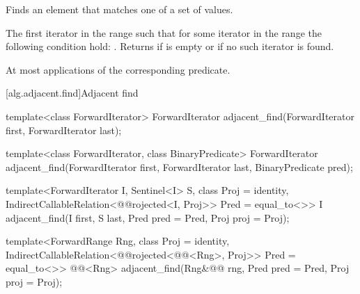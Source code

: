 \begin{itemdescr}
\pnum
\effects
Finds an element that matches one of a set of values.

\pnum
\returns
The first iterator
in the range 
such that for some
iterator
in the range 
the following condition hold:
.
Returns 
if  is empty or if
no such iterator is found.

\pnum
\complexity
At most
applications of the corresponding predicate.
\end{itemdescr}

[alg.adjacent.find]{Adjacent find}

%
\begin{removedblock}
\begin{itemdecl}
template<class ForwardIterator>
  ForwardIterator adjacent_find(ForwardIterator first, ForwardIterator last);

template<class ForwardIterator, class BinaryPredicate>
  ForwardIterator adjacent_find(ForwardIterator first, ForwardIterator last,
                              BinaryPredicate pred);
\end{itemdecl}
\end{removedblock}
\begin{addedblock}
\begin{itemdecl}
template<ForwardIterator I, Sentinel<I> S, class Proj = identity,
    IndirectCallableRelation<@@rojected<I, Proj>> Pred = equal_to<>>
  I
    adjacent_find(I first, S last, Pred pred = Pred{},
                  Proj proj = Proj{});

template<ForwardRange Rng, class Proj = identity,
    IndirectCallableRelation<@@rojected<@@<Rng>, Proj>> Pred = equal_to<>>
  @@<Rng>
    adjacent_find(Rng&@\newtxt{\&}@ rng, Pred pred = Pred{}, Proj proj = Proj{});
\end{itemdecl}
\end{addedblock}

